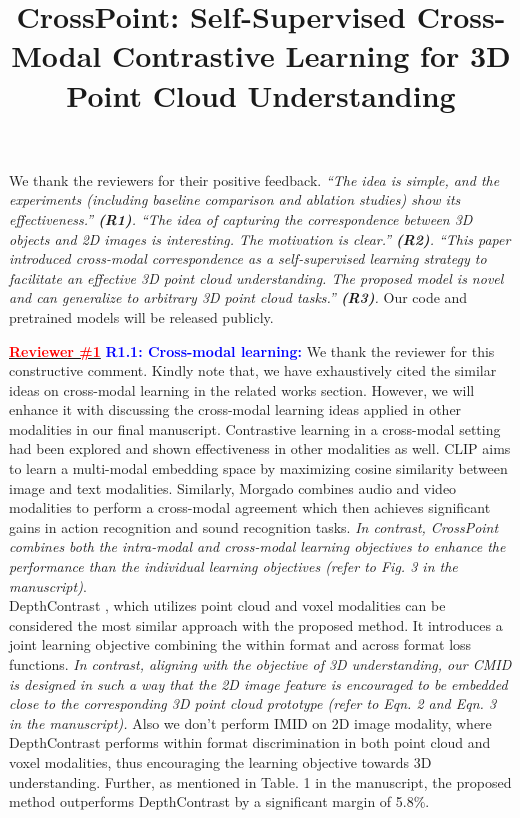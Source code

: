 \documentclass[10pt,twocolumn,letterpaper]{article}
\begin{document}
\title{CrossPoint: Self-Supervised Cross-Modal Contrastive Learning for 3D Point Cloud Understanding}  

\maketitle
\thispagestyle{empty}
\appendix

\noindent We thank the reviewers for their positive feedback. \textit{``The idea is simple, and the experiments (including baseline comparison and ablation studies) show its effectiveness.'' \textbf{(R1)}. ``The idea of capturing the correspondence between 3D objects and 2D images is interesting. The motivation is clear.'' \textbf{(R2)}. ``This paper introduced cross-modal correspondence as a self-supervised learning strategy to facilitate an effective 3D point cloud understanding. The proposed model is novel and can generalize to arbitrary 3D point cloud tasks.'' \textbf{(R3)}.} Our code and pretrained models will be released publicly.

\vspace{2mm}
\noindent \underline{\textcolor{red}{\textbf{Reviewer \#1}}} \textcolor{blue}{\textbf{R1.1: Cross-modal learning:}} We thank the reviewer for this constructive comment. Kindly note that, we have exhaustively cited the similar ideas on cross-modal learning in the related works section. However, we will enhance it with discussing the cross-modal learning ideas applied in other modalities in our final manuscript. Contrastive learning in a cross-modal setting had been explored and shown effectiveness in other modalities as well. CLIP \cite{CLIP_reb} aims to learn a multi-modal embedding space by maximizing cosine similarity between image and text modalities. Similarly, Morgado \etal \cite{AVID_reb} combines audio and video modalities to perform a cross-modal agreement which then achieves significant gains in action recognition and sound recognition tasks. \emph{In contrast, CrossPoint combines both the intra-modal and cross-modal learning objectives to enhance the performance than the individual learning objectives (refer to Fig. 3 in the manuscript)}.\\ DepthContrast \cite{any_pointcloud_reb}, which utilizes point cloud and voxel modalities can be considered the most similar approach with the proposed method. It introduces a joint learning objective combining the within format and across format loss functions. \emph{In contrast, aligning with the objective of 3D understanding, our CMID is designed in such a way that the 2D image feature is encouraged to be embedded close to the corresponding 3D point cloud \textit{prototype} (refer to Eqn. 2 and Eqn. 3 in the manuscript).} Also we don't perform IMID on 2D image modality, where DepthContrast performs within format discrimination in both point cloud and voxel modalities, thus encouraging the learning objective towards 3D understanding. Further, as mentioned in Table. 1 in the manuscript, the proposed method outperforms DepthContrast by a significant margin of 5.8\%. 
\end{document}
